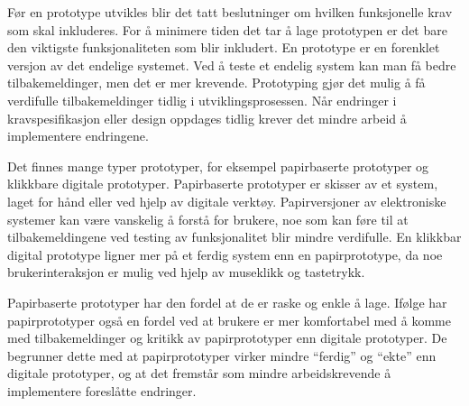 Før en prototype utvikles blir det tatt beslutninger om hvilken funksjonelle krav som skal inkluderes. For å minimere tiden det tar å lage prototypen er det bare den viktigste funksjonaliteten som blir inkludert\citep{suBoken}. En prototype er en forenklet versjon av det endelige systemet. Ved å teste et endelig system kan man få bedre tilbakemeldinger, men det er mer krevende. Prototyping gjør det mulig å få verdifulle tilbakemeldinger tidlig i utviklingsprosessen. Når endringer i kravspesifikasjon eller design oppdages tidlig krever det mindre arbeid å implementere endringene.

Det finnes mange typer prototyper, for eksempel papirbaserte prototyper og klikkbare digitale prototyper. Papirbaserte prototyper er skisser av et system, laget for hånd eller ved hjelp av digitale verktøy. Papirversjoner av elektroniske systemer kan være vanskelig å forstå for brukere, noe som kan føre til at tilbakemeldingene ved testing av funksjonalitet blir mindre verdifulle. 
En klikkbar digital prototype ligner mer på et ferdig system enn en papirprototype, da noe brukerinteraksjon er mulig ved hjelp av museklikk og tastetrykk. 

Papirbaserte prototyper har den fordel at de er raske og enkle å lage. Ifølge \citep{prototypingWebDesign} har papirprototyper også en fordel ved at brukere er mer komfortabel med å komme med tilbakemeldinger og kritikk av papirprototyper enn digitale prototyper. De begrunner dette med at papirprototyper virker mindre ``ferdig'' og ``ekte'' enn digitale prototyper, og at det fremstår som mindre arbeidskrevende å implementere foreslåtte endringer.



